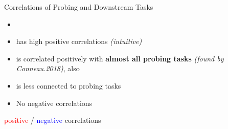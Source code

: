 \documentclass[accentcolor=tud1a,colorbacktitle,inverttitle,landscape,german,presentation,t]{tudbeamer}
\begin{document}
\begin{frame}{Correlations of Probing and Downstream Tasks}{}
\begin{minipage}{0.69\textwidth}
		\begin{itemize}\setlength\itemsep{1em}
			\item[] 
			\item {} has high positive correlations \textit{(intuitive)}
			\item {} is correlated positively with \textbf{almost all probing tasks} \textit{(found by Conneau.2018)}, also 
			\item {} is less connected to probing tasks
			\item No negative correlations
		\end{itemize}
		\vfill
		{\footnotesize \textcolor{red}{positive} / \textcolor{blue}{negative} correlations}
	\end{minipage}
\end{frame}
\end{document}
